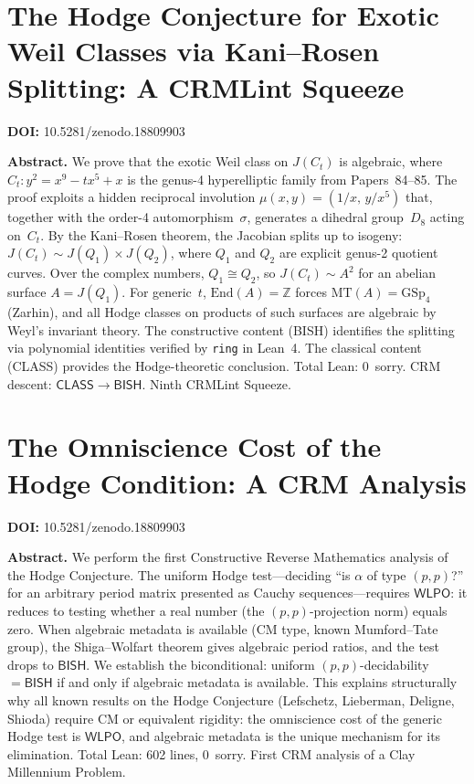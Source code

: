 \documentclass[11pt,a4paper]{article}
\begin{document}
\section{The Hodge Conjecture for Exotic Weil Classes via Kani--Rosen Splitting: A CRMLint Squeeze}
\label{sec:p86}
\textbf{DOI:} 10.5281/zenodo.18809903

\bigskip
\noindent\textbf{Abstract.}
We prove that the exotic Weil class on $J(C_t)$ is algebraic, where $C_t\colon y^2 = x^9 - tx^5 + x$ is the genus-4 hyperelliptic family from Papers~84--85. The proof exploits a hidden reciprocal involution $\mu(x,y) = (1/x,\, y/x^5)$ that, together with the order-4 automorphism~$\sigma$, generates a dihedral group~$D_8$ acting on~$C_t$. By the Kani--Rosen theorem, the Jacobian splits up to isogeny: $J(C_t) \sim J(Q_1) \times J(Q_2)$, where $Q_1$ and $Q_2$ are explicit genus-2 quotient curves. Over the complex numbers, $Q_1 \cong Q_2$, so $J(C_t) \sim A^2$ for an abelian surface $A = J(Q_1)$. For generic~$t$, $\mathrm{End}(A) = \mathbb{Z}$ forces $\mathrm{MT}(A) = \mathrm{GSp}_4$ (Zarhin), and all Hodge classes on products of such surfaces are algebraic by Weyl's invariant theory. The constructive content (BISH) identifies the splitting via polynomial identities verified by \texttt{ring} in Lean~4. The classical content (CLASS) provides the Hodge-theoretic conclusion. Total Lean: 0~sorry. CRM descent: $\mathsf{CLASS} \to \mathsf{BISH}$. Ninth CRMLint Squeeze.

\section{The Omniscience Cost of the Hodge Condition: A CRM Analysis}
\label{sec:p87}
\textbf{DOI:} 10.5281/zenodo.18809903

\bigskip
\noindent\textbf{Abstract.}
We perform the first Constructive Reverse Mathematics analysis of the Hodge Conjecture. The uniform Hodge test---deciding ``is $\alpha$ of type $(p,p)$?'' for an arbitrary period matrix presented as Cauchy sequences---requires $\mathsf{WLPO}$: it reduces to testing whether a real number (the $(p,p)$-projection norm) equals zero. When algebraic metadata is available (CM type, known Mumford--Tate group), the Shiga--Wolfart theorem gives algebraic period ratios, and the test drops to $\mathsf{BISH}$. We establish the biconditional: uniform $(p,p)$-decidability $= \mathsf{BISH}$ if and only if algebraic metadata is available. This explains structurally why all known results on the Hodge Conjecture (Lefschetz, Lieberman, Deligne, Shioda) require CM or equivalent rigidity: the omniscience cost of the generic Hodge test is $\mathsf{WLPO}$, and algebraic metadata is the unique mechanism for its elimination. Total Lean: 602 lines, 0~sorry. First CRM analysis of a Clay Millennium Problem.
\end{document}
